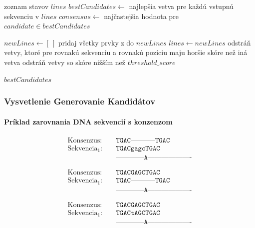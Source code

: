 \begin{algorithm}
\caption{Multi-Alignment}\label{alg:cap}
\begin{algorithmic}
    \Require zoznam stavov $lines$
        \State $bestCandidates \gets$ najlepšia vetva pre každú vstupnú sekvenciu v $lines$
        \State $consensus \gets$ najčastejšia hodnota  pre $candidate \in bestCandidates$

        \State $newLines \gets [\ ]$
            \State pridaj všetky prvky z  do $newLines$
        \EndFor
        \State $lines \gets newLines$
        \State odstráň vetvy, ktoré pre rovnakú sekvenciu a rovnakú pozíciu maju horšie skóre než iná vetva
        \State odstráň vetvy so skóre nižším než $threshold\_score$

            \State \Return $bestCandidates$
        \EndIf
    \EndWhile
\end{algorithmic}
\end{algorithm}
\subsubsection{Vysvetlenie Generovanie Kandidátov}

\paragraph{Príklad zarovnania DNA sekvencií s konzenzom}

\begin{align*}
\text{Konsenzus:} \quad &   \texttt{TGAC-----------TGAC} \\
\text{Sekvencia}_1: \quad & \texttt{TGACgagcTGAC}\\
& \texttt{------------A-------------------} 
\end{align*}

\begin{align*}
\text{Konsenzus:} \quad &   \texttt{TGACGAGCTGAC}\\
\text{Sekvencia}_1: \quad & \texttt{TGAC-----------TGAC}\\ 
& \texttt{------------A-------------------} 
\end{align*}

\begin{align*}
\text{Konsenzus:} \quad &   \texttt{TGACGAGCTGAC}\\
\text{Sekvencia}_1: \quad & \texttt{TGACtAGCTGAC}\\ 
& \texttt{------------A-------------------} 
\end{align*}